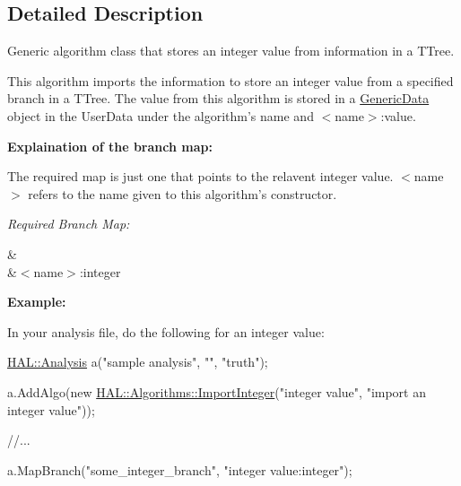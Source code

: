 \subsection{Detailed Description}
Generic algorithm class that stores an integer value from information in a T\-Tree. 

This algorithm imports the information to store an integer value from a specified branch in a T\-Tree. The value from this algorithm is stored in a \hyperlink{class_h_a_l_1_1_generic_data}{Generic\-Data} object in the User\-Data under the algorithm's name and $<$name$>$\-:value.\par
\par
 {\bfseries Explaination of the branch map\-:}\par
 The required map is just one that points to the relavent integer value. $<$name$>$ refers to the name given to this algorithm's constructor.\par
 {\itshape Required Branch Map\-:} \begin{TabularC}{2}
\hline
{}&\PBS{}\\
&\PBS\centering $<$name$>$\-:integer \\
\end{TabularC}
{\bfseries Example\-:}\par
 In your analysis file, do the following for an integer value\-:


\begin{DoxyCode}
\hyperlink{class_h_a_l_1_1_analysis}{HAL::Analysis} a(\textcolor{stringliteral}{"sample analysis"}, \textcolor{stringliteral}{""}, \textcolor{stringliteral}{"truth"});

a.AddAlgo(\textcolor{keyword}{new} \hyperlink{class_h_a_l_1_1_algorithms_1_1_import_integer}{HAL::Algorithms::ImportInteger}(\textcolor{stringliteral}{"integer value"}, \textcolor{stringliteral}{"import an
       integer value"}));

\textcolor{comment}{//...}

a.MapBranch(\textcolor{stringliteral}{"some\_integer\_branch"}, \textcolor{stringliteral}{"integer value:integer"});
\end{DoxyCode}
 

